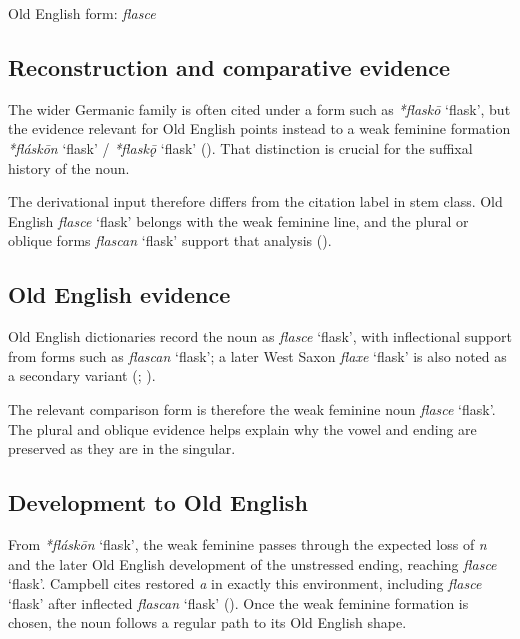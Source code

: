 \documentclass[
  british,
  a4paper,
  openany]{book}
\providecommand{\Recon}[1]{\emph{*#1}}
{\catcode`→=\active \global\def→{\ensuremath{\rightarrow}}}
\providecommand{\Recon}[1]{\emph{*#1}}
{\catcode`→=\active \global\def→{\ensuremath{\rightarrow}}}
\begin{document}
Old English form: \emph{flasce}

\subsection{Reconstruction and comparative
evidence}\label{reconstruction-and-comparative-evidence-80}

The wider Germanic family is often cited under a form such as
{\Recon{flaskō} `flask'}, but the evidence relevant for Old English
points instead to a weak feminine formation {\Recon{fláskōn} `flask'} /
{\Recon{flaskǭ} `flask'} (). That
distinction is crucial for the suffixal history of the noun.

The derivational input therefore differs from the citation label in stem
class. Old English {\emph{flasce}} `flask' belongs with the weak
feminine line, and the plural or oblique forms {\emph{flascan}} `flask'
support that analysis ().

\subsection{Old English evidence}\label{old-english-evidence-80}

Old English dictionaries record the noun as {\emph{flasce}} `flask',
with inflectional support from forms such as {\emph{flascan}} `flask'; a
later West Saxon {\emph{flaxe}} `flask' is also noted as a secondary
variant (; ).

The relevant comparison form is therefore the weak feminine noun
{\emph{flasce}} `flask'. The plural and oblique evidence helps explain
why the vowel and ending are preserved as they are in the singular.

\subsection{Development to Old
English}\label{development-to-old-english-80}

From {\Recon{fláskōn} `flask'}, the weak feminine passes through the
expected loss of \emph{n} and the later Old English development of the
unstressed ending, reaching {\emph{flasce}} `flask'. Campbell cites
restored \emph{a} in exactly this environment, including {\emph{flasce}}
`flask' after inflected {\emph{flascan}} `flask'
(). Once the weak
feminine formation is chosen, the noun follows a regular path to its Old
English shape.
\end{document}
